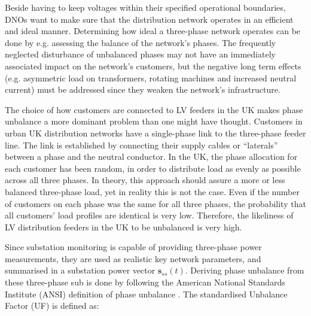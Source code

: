 Beside having to keep voltages within their specified operational boundaries, DNOs want to make sure that the distribution network operates in an efficient and ideal manner.
Determining how ideal a three-phase network operates can be done by e.g. assessing the balance of the network's phases.
The frequently neglected disturbance of unbalanced phases may not have an immediately associated impact on the network's customers, but the negative long term effects (e.g. asymmetric load on transformers, rotating machines and increased neutral current) must be addressed since they weaken the network's infrastructure.

The choice of how customers are connected to LV feeders in the UK makes phase unbalance a more dominant problem than one might have thought.
Customers in urban UK distribution networks have a single-phase link to the three-phase feeder line.
The link is established by connecting their supply cables or ``laterals'' between a phase and the neutral conductor.
In the UK, the phase allocation for each customer has been random, in order to distribute load as evenly as possible across all three phases.
In theory, this approach should assure a more or less balanced three-phase load, yet in reality this is not the case.
Even if the number of customers on each phase was the same for all three phases, the probability that all customers' load profiles are identical is very low.
Therefore, the likeliness of LV distribution feeders in the UK to be unbalanced is very high.



Since substation monitoring is capable of providing three-phase power measurements, they are used as realistic key network parameters, and summarised in a substation power vector $\textbf{s}_{ss}(t)$.
Deriving phase unbalance from these three-phase sub is done by following the American National Standards Institute (ANSI) definition of phase unbalance \cite{ANSI-MB-1-2011}.
The standardised Unbalance Factor (UF) is defined as:



